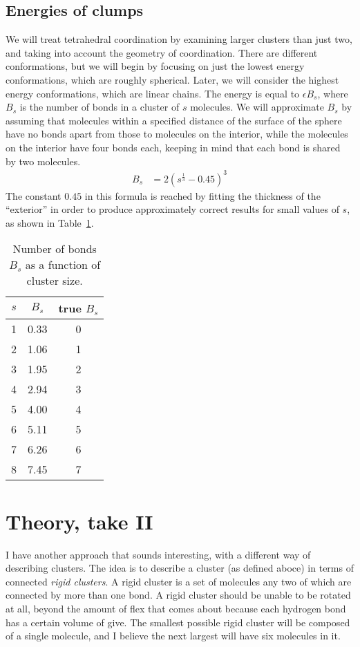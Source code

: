 \documentclass[letterpaper,twocolumn,amsmath,amssymb,pre]{revtex4-1}
\begin{document}
\subsection{Energies of clumps}

We will treat tetrahedral coordination by examining larger clusters
than just two, and taking into account the geometry of coordination.
There are different conformations, but we will begin by focusing on
just the lowest energy conformations, which are roughly spherical.
Later, we will consider the highest energy conformations, which are
linear chains.  The energy is equal to $\epsilon B_s$, where $B_s$ is
the number of bonds in a cluster of $s$ molecules.  We will
approximate $B_s$ by assuming that molecules within a specified
distance of the surface of the sphere have no bonds apart from those
to molecules on the interior, while the molecules on the interior have
four bonds each, keeping in mind that each bond is shared by two
molecules.
\begin{align}
  B_s &= 2(s^{\frac13} - 0.45)^3
\end{align}
The constant $0.45$ in this formula is reached by fitting the
thickness of the ``exterior'' in order to produce approximately
correct results for small values of $s$, as shown in
Table~\ref{tab:Bs}.
\begin{table}
  \begin{tabular}{c|cc}
    $s$ & $B_s$ & true $B_s$ \\
    \hline
    1 & 0.33 & 0 \\
    2 & 1.06 & 1 \\
    3 & 1.95 & 2 \\
    4 & 2.94 & 3 \\
    5 & 4.00 & 4 \\
    6 & 5.11 & 5 \\
    7 & 6.26 & 6 \\
    8 & 7.45 & 7 \\
  \end{tabular}
  \caption{Number of bonds $B_s$ as a function of cluster
    size.}\label{tab:Bs}
\end{table}

\section{Theory, take II}

I have another approach that sounds interesting, with a different way
of describing clusters.  The idea is to describe a cluster (as defined
aboce) in terms of connected \emph{rigid clusters}.  A rigid cluster
is a set of molecules any two of which are connected by more than one
bond.  A rigid cluster should be unable to be rotated at all, beyond
the amount of flex that comes about because each hydrogen bond has a
certain volume of give.  The smallest possible rigid cluster will be
composed of a single molecule, and I believe the next largest will
have six molecules in it.
\end{document}
